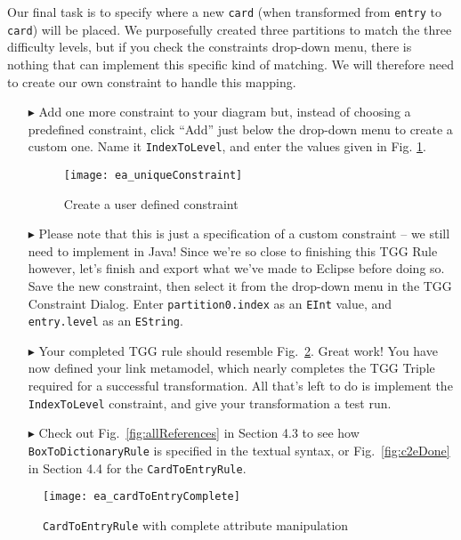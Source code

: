Our final task is to specify where a new \texttt{card} (when transformed from \texttt{entry} to \texttt{card}) will be placed.  We purposefully created three
partitions to match the three difficulty levels, but if you check the constraints drop-down menu, there is nothing that can implement this specific kind of
matching. We will therefore need to create our own constraint to handle this mapping.

\begin{enumerate}

\item[$\blacktriangleright$] Add one more constraint to your diagram but, instead of choosing a predefined constraint, click ``Add'' just below the
drop-down menu to create a custom one. Name it \texttt{IndexToLevel}, and enter the values given in Fig. \ref{fig:create_new_constraint}.

\vspace{0.5cm}

\begin{figure}[htbp]
\begin{center}
  \texttt{[image: ea\_uniqueConstraint]}
  \caption{Create a user defined constraint \update}
  \label{fig:create_new_constraint}
\end{center}
\end{figure}
\FloatBarrier

\item[$\blacktriangleright$] Please note that this is just a specification of a custom constraint -- we still need to implement in Java! Since we're so close to
finishing this TGG Rule however, let's finish and export what we've made to Eclipse before doing so. Save the new constraint, then select it from the drop-down
menu in the TGG Constraint Dialog. Enter \texttt{partition0.index} as an \texttt{EInt} value, and \texttt{entry.level} as an \texttt{EString}.

\vspace{0.5cm}

\item[$\blacktriangleright$] Your completed TGG rule should resemble Fig.~\ref{fig:cardtoentry_complete}. Great work! You have now defined your link metamodel,
which nearly completes the TGG Triple required for a successful transformation. All that's left to do is implement the \texttt{IndexToLevel} constraint, and
give your transformation a test run.

\vspace{0.5cm}

\item[$\blacktriangleright$] Check out Fig.~\ref{fig:allReferences} in Section 4.3 to see how \texttt{BoxToDictionaryRule} is specified in the textual syntax,
or Fig.~\ref{fig:c2eDone} in Section 4.4 for the \texttt{CardToEntryRule}.

\end{enumerate}

\newpage

\vspace*{3cm}

\begin{figure}[htbp]
\begin{center}
  \texttt{[image: ea\_cardToEntryComplete]}
  \caption{\texttt{CardToEntryRule} with complete attribute manipulation}
  \label{fig:cardtoentry_complete}
\end{center}
\end{figure}


